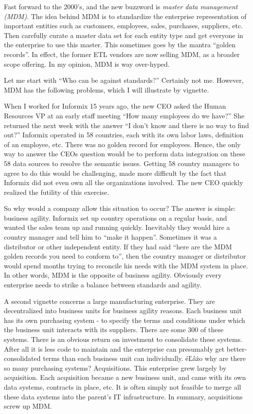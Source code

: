 \documentclass[b5paper,11pt,twoside,openright]{book}
\begin{document}
Fast forward to the 2000's, and the new buzzword is \emph{master data
  management (MDM)}. The idea behind MDM is to standardize the enterprise
representation of important entities such as customers, employees,
sales, purchases, suppliers, etc. Then carefully curate a master data
set for each entity type and get everyone in the enterprise to use this
master. This sometimes goes by the mantra ``golden records''. In effect,
the former ETL vendors are now selling MDM, as a broader scope offering.
In my opinion, MDM is way over-hyped.

Let me start with ``Who can be against standards?'' Certainly not me.
However, MDM has the following problems, which I will illustrate by
vignette.

When I worked for Informix 15 years ago, the new CEO asked the Human
Resources VP at an early staff meeting ``How many employees do we
have?'' She returned the next week with the answer ``I don't know and
there is no way to find out?'' Informix operated in 58 countries, each
with its own labor laws, definition of an employee, etc. There was no
golden record for employees. Hence, the only way to answer the CEOs
question would be to perform data integration on these 58 data sources
to resolve the semantic issues. Getting 58 country managers to agree to
do this would be challenging, made more difficult by the fact that
Informix did not even own all the organizations involved. The new CEO
quickly realized the futility of this exercise.

So why would a company allow this situation to occur? The answer is
simple: business agility. Informix set up country operations on a
regular basis, and wanted the sales team up and running quickly.
Inevitably they would hire a country manager and tell him to ``make it
happen''. Sometimes it was a distributor or other independent entity. If
they had said ``here are the MDM golden records you need to conform
to'', then the country manager or distributor would spend months trying
to reconcile his needs with the MDM system in place. In other words, MDM
is the opposite of business agility. Obviously every enterprise needs to
strike a balance between standards and agility.

A second vignette concerns a large manufacturing enterprise. They are
decentralized into business units for business agility reasons. Each
business unit has its own purchasing system - to specify the terms and
conditions under which the business unit interacts with its suppliers.
There are some 300 of these systems. There is an obvious return on
investment to consolidate these systems. After all it is less code to
maintain and the enterprise can presumably get better-consolidated terms
than each business unit can individually. éĽâżo why are there so many
purchasing systems? Acquisitions. This enterprise grew largely by
acquisition. Each acquisition became a new business unit, and came with
its own data systems, contracts in place, etc. It is often simply not
feasible to merge all these data systems into the parent's IT
infrastructure. In summary, acquisitions screw up MDM.
\end{document}
